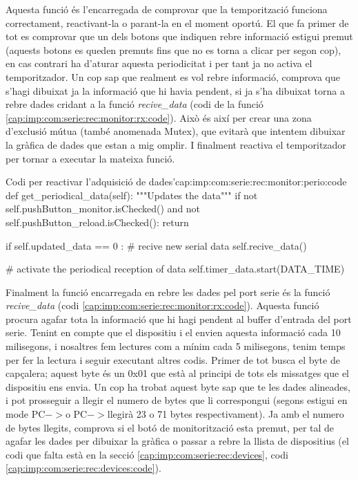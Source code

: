 Aquesta funció és l'encarregada de comprovar que la temporització funciona correctament, reactivant-la o parant-la en el moment oportú. El que fa primer de tot es comprovar que un dels botons que indiquen rebre informació estigui premut (aquests botons es queden premuts fins que no es torna a clicar per segon cop), en cas contrari ha d'aturar aquesta periodicitat i per tant ja no activa el temporitzador.
Un cop sap que realment es vol rebre informació, comprova que s'hagi dibuixat ja la informació que hi havia pendent, si ja s'ha dibuixat torna a rebre dades cridant a la funció \emph{recive\_data} (codi de la funció \ref{cap:imp:com:serie:rec:monitor:rx:code}). Això és així per crear una zona d'exclusió mútua (també anomenada Mutex), que evitarà que intentem dibuixar la gràfica de dades que estan a mig omplir.
I finalment reactiva el temporitzador per tornar a executar la mateixa funció.

\begin{code_python}{Codi per reactivar l'adquisició de dades'}{cap:imp:com:serie:rec:monitor:perio:code}
def get_periodical_data(self):
    """Updates the data"""
    if not self.pushButton_monitor.isChecked() and not self.pushButton_reload.isChecked():
        return
    
    if self.updated_data == 0 :
        # recive new serial data
        self.recive_data()
        
    # activate the periodical reception of data
    self.timer_data.start(DATA_TIME)
\end{code_python}

Finalment la funció encarregada en rebre les dades pel port serie és la funció \emph{recive\_data} (codi \ref{cap:imp:com:serie:rec:monitor:rx:code}). Aquesta funció procura agafar tota la informació que hi hagi pendent al buffer d'entrada del port serie. Tenint en compte que el dispositiu \Monitor i el \SensorActuador envien aquesta informació cada 10 milisegons, i nosaltres fem lectures com a mínim cada 5 milisegons, tenim temps per fer la lectura i seguir executant altres codis. Primer de tot busca el byte de capçalera; aquest byte és un 0x01 que està al principi de tots els missatges que el dispositiu ens envia. Un cop ha trobat aquest byte sap que te les dades alineades, i pot prosseguir a llegir el numero de bytes que li correspongui (segons estigui en mode PC$->$\SensorActuador o PC$->$\Monitor llegirà 23 o 71 bytes respectivament). Ja amb el numero de bytes llegits, comprova si el botó de monitorització esta premut, per tal de agafar les dades per dibuixar la gràfica o passar a rebre la llista de dispositius (el codi que falta està en la secció \ref{cap:imp:com:serie:rec:devices}, codi \ref{cap:imp:com:serie:rec:devices:code}).

